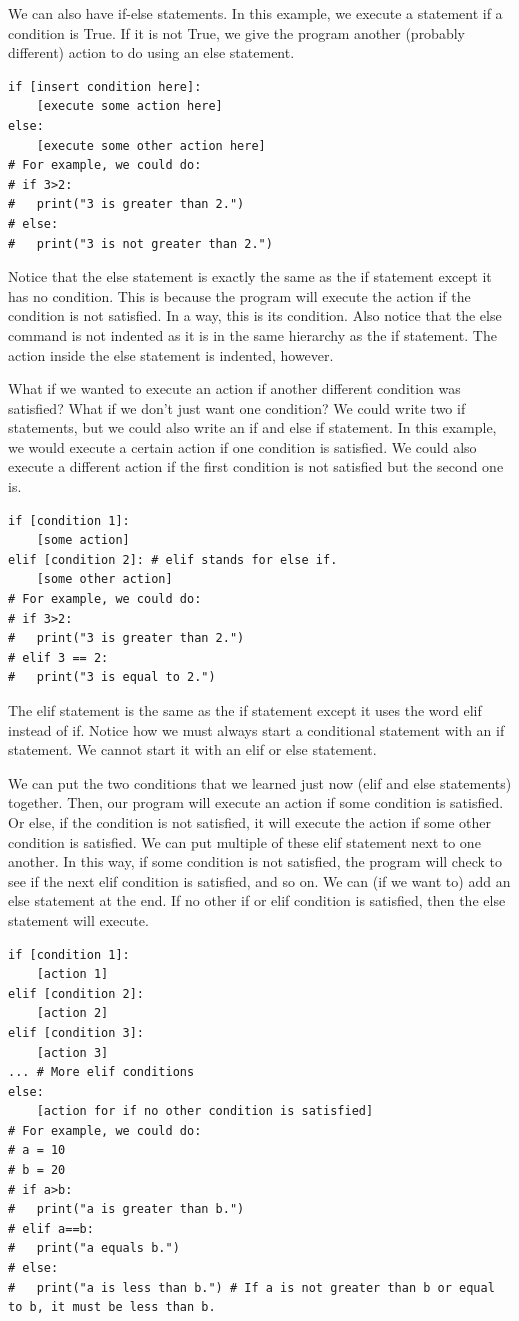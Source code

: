 \documentclass{article}
\begin{document}
We can also have if-else statements. In this example, we execute a statement if a condition is True. If it is not True, we give the program another (probably different) action to do using an else statement.
\begin{lstlisting}
if [insert condition here]:
    [execute some action here]
else:
    [execute some other action here]
# For example, we could do:
# if 3>2:
#   print("3 is greater than 2.")
# else:
#   print("3 is not greater than 2.")
\end{lstlisting}
Notice that the else statement is exactly the same as the if statement except it has no condition. This is because the program will execute the action if the condition is not satisfied. In a way, this is its condition. Also notice that the else command is not indented as it is in the same hierarchy as the if statement. The action inside the else statement is indented, however. 

What if we wanted to execute an action if another different condition was satisfied? What if we don't just want one condition? We could write two if statements, but we could also write an if and else if statement. In this example, we would execute a certain action if one condition is satisfied. We could also execute a different action if the first condition is not satisfied but the second one is. 
\begin{lstlisting}
if [condition 1]:
    [some action]
elif [condition 2]: # elif stands for else if.
    [some other action]
# For example, we could do:
# if 3>2:
#   print("3 is greater than 2.")
# elif 3 == 2:
#   print("3 is equal to 2.")
\end{lstlisting}
The elif statement is the same as the if statement except it uses the word elif instead of if. Notice how we must always start a conditional statement with an if statement. We cannot start it with an elif or else statement. 

We can put the two conditions that we learned just now (elif and else statements) together. Then, our program will execute an action if some condition is satisfied. Or else, if the condition is not satisfied, it will execute the action if some other condition is satisfied. We can put multiple of these elif statement next to one another. In this way, if some condition is not satisfied, the program will check to see if the next elif condition is satisfied, and so on. We can (if we want to) add an else statement at the end. If no other if or elif condition is satisfied, then the else statement will execute. 
\begin{lstlisting}
if [condition 1]:
    [action 1]
elif [condition 2]:
    [action 2]
elif [condition 3]:
    [action 3]
... # More elif conditions 
else: 
    [action for if no other condition is satisfied]
# For example, we could do:
# a = 10
# b = 20
# if a>b:
#   print("a is greater than b.")
# elif a==b:
#   print("a equals b.")
# else:
#   print("a is less than b.") # If a is not greater than b or equal to b, it must be less than b.
\end{lstlisting}
\end{document}
